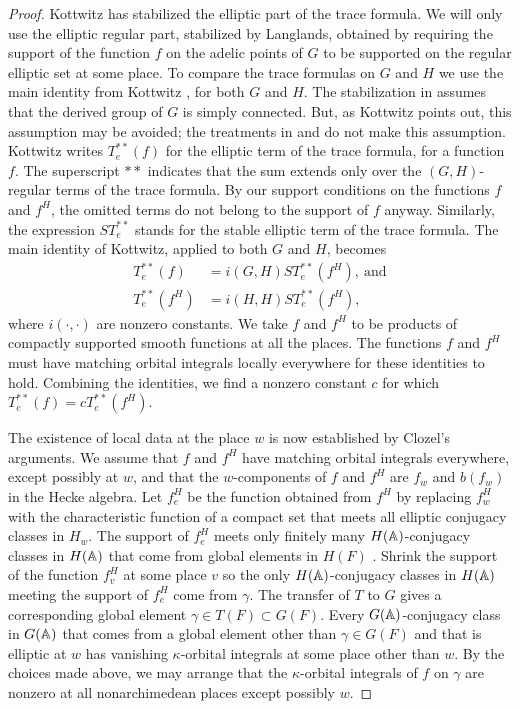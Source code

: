 \documentclass{amsart}
\begin{document}
\begin{proof}
Kottwitz has stabilized the elliptic part of the trace formula.
We will only use the elliptic regular part, stabilized
by Langlands, obtained
by requiring the support of the function $f$ on the adelic points
of $G$ to be supported on the regular elliptic 
set at some place.  To compare the trace formulas on $G$ and $H$
we use the main identity from Kottwitz \cite{Ko3}, for both $G$ and
$H$.  The stabilization in \cite{Ko3} assumes that the
derived group of $G$ is simply connected.  But, as Kottwitz points out,
this assumption may be avoided; the treatments in \cite{L} and
\cite{KS2} do not make this assumption.
Kottwitz writes $T_e^{**}(f)$ for the elliptic term of the
trace formula, for a function $f$.  The superscript ${**}$
indicates that the sum extends only over the $(G,H)$-regular
terms of the trace formula.  By our support conditions on the
functions $f$ and $f^H$, the omitted terms do not belong
to the support of $f$ anyway.  Similarly, the expression $ST_e^{**}$
stands for the stable elliptic term of the trace formula.
The main identity of Kottwitz, applied to both
$G$ and $H$, becomes
\begin{align*}
T_e^{**}(f) &= i(G,H) ST_e^{**}(f^{H}),\ \text{and}\\
T_e^{**}(f^{H}) &= i(H,H) ST_e^{**}(f^{H}),
\end{align*}
where 
$i(\cdot,\cdot)$ are nonzero constants.
We take $f$ and $f^H$ to be products of compactly supported smooth
functions at all the places.
The functions $f$ and $f^{H}$ 
must have matching orbital integrals
locally everywhere
for these identities to hold.  
Combining the identities, we find a nonzero constant
$c$  for which $T^{**}_e(f) = c T_e^{**}(f^{H})$.

The existence of local data at the place $w$ is now
established by Clozel's arguments.  
We assume that $f$ and $f^{H}$ have matching
orbital integrals everywhere, except possibly at $w$, and
that the $w$-components of $f$ and $f^{H}$ are  $f_w$ and
$b(f_w)$ in the Hecke algebra.  Let $f_e^H$ be the function
obtained from $f^H$ by replacing $f_w^H$ with the characteristic
function of a compact set that meets all elliptic
conjugacy classes in $H_w$. The support of
$f_e^H$ meets only finitely many $H(\Bbb A)$-conjugacy
classes
in $H(\Bbb A)$ that come from global elements in $H(F)$
\cite{Ko3,8.2}.
 Shrink
the support of the function $f_v^H$ at some place $v$
so the only 
$H({\Bbb A})$-conjugacy classes in $H(\Bbb A)$
meeting the support of $f_e^H$ come from $\gamma$.
The transfer of $T$ to $G$ gives a
corresponding global element $\gamma\in T(F)\subset G(F)$.
Every $G(\Bbb A)$-conjugacy class in $G(\Bbb A)$ that comes
from a global element other than $\gamma\in G(F)$ and
that is elliptic
at $w$ has vanishing $\kappa$-orbital integrals at some place other
than $w$.
By the choices made above,
we may arrange 
that the $\kappa$-orbital integrals of $f$ on $\gamma$ 
are nonzero at all
nonarchimedean places except possibly $w$.


\end{proof}
\end{document}
